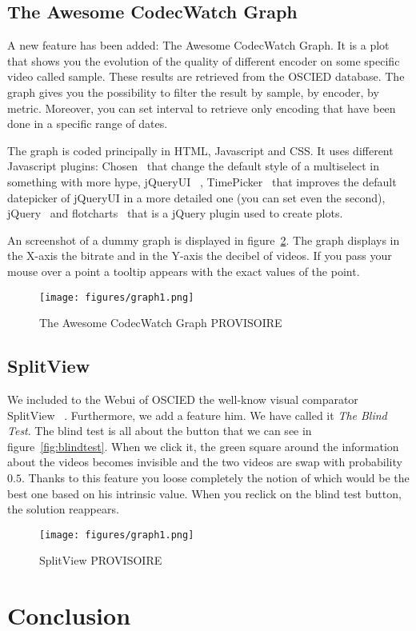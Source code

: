 \documentclass[a4paper,12pt]{article}
\begin{document}
\subsection{The Awesome CodecWatch Graph}
A new feature has been added: The Awesome CodecWatch Graph. It is a plot that shows you the evolution of the quality of different encoder on some specific video called sample. These results are retrieved from the OSCIED database. The graph gives you the possibility to filter the result by sample, by encoder, by metric. Moreover, you can set interval to retrieve only encoding that have been done in a specific range of dates.

The graph is coded principally in HTML, Javascript and CSS. It uses different Javascript plugins: Chosen~ \cite{harvesthq_chosen} that change the default style of a multiselect in something with more hype, jQueryUI~ \cite{jqueryui}, TimePicker~ \cite{timepicker} that improves the default datepicker of jQueryUI in a more detailed one (you can set even the second), jQuery~ \cite{jquery} and flotcharts~ \cite{flotchart} that is a jQuery plugin used to create plots.

An screenshot of a dummy graph is displayed in figure~\ref{fig:graph1}. The graph displays in the X-axis the bitrate and in the Y-axis the decibel of videos. If you pass your mouse over a point a tooltip appears with the exact values of the point.

\begin{figure}[!h]
	\centering
	\texttt{[image: figures/graph1.png]}
	\caption{The Awesome CodecWatch Graph PROVISOIRE}
	\label{fig:graph1}
\end{figure}

\subsection{SplitView}
We included to the Webui of OSCIED the well-know visual comparator SplitView~ \cite{splitview}. Furthermore, we add a feature him. We have called it \emph{The Blind Test}. The blind test is all about the button that we can see in figure~\ref{fig:blindtest}. When we click it, the green square around the information about the videos becomes invisible and the two videos are swap with probability $0.5$. Thanks to this feature you loose completely the notion of which would be the best one based on his intrinsic value. When you reclick on the blind test button, the solution reappears.

\begin{figure}[!h]
	\centering
	\texttt{[image: figures/graph1.png]}
	\caption{SplitView PROVISOIRE}
	\label{fig:graph1}
\end{figure}




\section{Conclusion}

\appendix
{}

\end{document}

